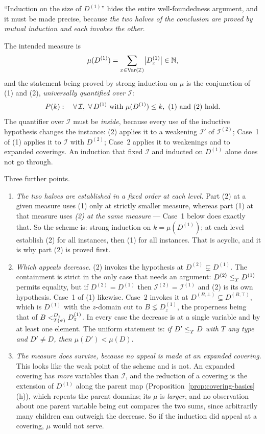 \begin{hazard}\label{haz:the-induction}
``Induction on the size of $D^{(1)}$'' hides the entire well-foundedness
argument, and it must be made precise, because \emph{the two halves of the
conclusion are proved by mutual induction and each invokes the other}.

The intended measure is
\[
  \mu(D^{(1)})=\sum_{x\in\Var(\mathcal I)}\bigl|D^{(1)}_{x}\bigr|\in\mathbb N,
\]
and the statement being proved by strong induction on $\mu$ is the
conjunction of (1) and (2), \emph{universally quantified over $\mathcal I$}:
\[
  P(k):\quad
  \forall\,\mathcal I,\ \forall\,D^{(1)}\ \text{with}\ \mu(D^{(1)})\le k,\
  \textup{(1)}\ \text{and}\ \textup{(2)}\ \text{hold}.
\]
The quantifier over $\mathcal I$ must be \emph{inside}, because every use of the
inductive hypothesis changes the instance: (2) applies it to a weakening
$\mathcal I'$ of $\mathcal I^{(2)}$; Case~1 of (1) applies it to $\mathcal I$
with $D^{(2)}$; Case~2 applies it to weakenings and to expanded coverings. An
induction that fixed $\mathcal I$ and inducted on $D^{(1)}$ alone does not go
through.

Three further points.
\begin{enumerate}\alphlabels\tightlist
\item \emph{The two halves are established in a fixed order at each level.}
  Part (2) at a given measure uses (1) only at strictly smaller measure,
  whereas part (1) at that measure uses \emph{(2) at the same measure} ---
  Case~1 below does exactly that. So the scheme is: strong induction on
  $k=\mu(D^{(1)})$; at each level establish (2) for all instances, then (1) for
  all instances. That is acyclic, and it is why part (2) is proved first.
\item \emph{Which appeals decrease.} (2) invokes the hypothesis at
  $D^{(2)}\subsetneq D^{(1)}$. The containment is strict in the only case that
  needs an argument: $D^{(2)}\subte{T}D^{(1)}$ permits equality, but if
  $D^{(2)}=D^{(1)}$ then $\mathcal I^{(2)}=\mathcal I^{(1)}$ and (2) is its own
  hypothesis. Case~1 of (1) likewise. Case~2 invokes it at
  $D^{(B,\bot)}\subseteq D^{(B,\top)}$, which is $D^{(1)}$ with the $z$-domain
  cut to $B\lneq D^{(1)}_{z}$, the properness being that of
  $B\subt[D_{z}]{T(\sigma)}D^{(1)}_{z}$. In every case the decrease is at a
  single variable and by at least one element. The uniform statement is:
  \emph{if $D'\subte{T}D$ with $T$ any type and $D'\neq D$, then
  $\mu(D')<\mu(D)$}.
\item \emph{The measure does survive, because no appeal is made at an
  expanded covering.} This looks like the weak point of the scheme and is not.
  An expanded covering has \emph{more} variables than $\mathcal I$, and the
  reduction of a covering is the extension of $D^{(1)}$ along the parent map
  (Proposition~\ref{prop:covering-basics}(h)), which repeats the parent
  domains; its $\mu$ is \emph{larger}, and no observation about one parent
  variable being cut compares the two sums, since arbitrarily many children can
  outweigh the decrease. So if the induction did appeal at a covering, $\mu$
  would not serve.


\end{enumerate}
\end{hazard}
